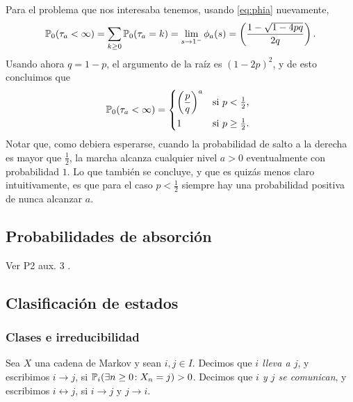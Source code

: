 Para el problema que nos interesaba tenemos, usando \eqref{eq:phia} nuevamente,
\[\mathbb{P}_0(\tau_a<\infty)=\sum_{k\geq0}\mathbb{P}_0(\tau_a=k)=\lim_{s\to1^-}\phi_a(s)=\left(\frac{1-\sqrt{1-4pq}}{2q}\right).\]
Usando ahora $q=1-p$, el argumento de la raíz es $(1-2p)^2$, y de esto concluimos que
\[\pp_0(\tau_a<\infty)=
\begin{dcases*}
\left(\frac{p}{q}\right)^a & si $p<\tfrac12$,\\
1 & si $p\geq\tfrac12$.
\end{dcases*}\]
Notar que, como debiera esperarse, cuando la probabilidad de salto a la derecha es mayor que $\frac12$, la marcha alcanza cualquier nivel $a>0$ eventualmente con probabilidad $1$.
Lo que también se concluye, y que es quizás menos claro intuitivamente, es que para el caso $p<\frac12$ siempre hay una probabilidad positiva de nunca alcanzar $a$.

\subsection{Probabilidades de absorción}

Ver P2 aux. 3 \ucmark.

\subsection{Clasificación de estados}

\subsubsection{Clases e irreducibilidad}

\begin{defn}
Sea $X$ una cadena de Markov y sean $i,j\in I$.
Decimos que \emph{$i$ lleva a $j$}, y escribimos $i\to j$, si $\mathbb{P}_i(\exists n\geq0\!:X_n=j)>0$.
Decimos que \emph{$i$ y $j$ se comunican}, y escribimos $i\leftrightarrow j$, si $i\to j$ y $j\to i$.
\end{defn}

